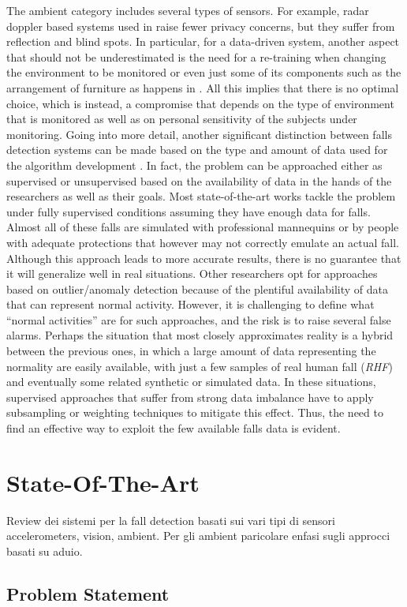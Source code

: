 The ambient category includes several types of sensors. For example, radar doppler based systems used in \cite{wu2015radar} raise fewer privacy concerns, but they suffer from reflection and blind spots. In particular, for a data-driven system, another aspect that should not be underestimated is the need for a re-training when changing the environment to be monitored or even just some of its components such as the arrangement of furniture as happens in \cite{liu2008vision}.
All this implies that there is no optimal choice, which is instead, a compromise that depends on the type of environment that is monitored as well as on personal sensitivity of the subjects under monitoring.
Going into more detail, another significant distinction between falls detection systems can be made based on the type and amount of data used for the algorithm development \cite{khan2017review}. In fact, the problem can be approached either as supervised or unsupervised based on the availability of data in the hands of the researchers as well as their goals. 
Most state-of-the-art works tackle the problem under fully supervised conditions assuming they have enough data for falls. Almost all of these falls are simulated with professional mannequins \cite{werner2011fall, zigel2009method}  or by people with adequate protections \cite{li2012microphone, popescu2008acoustic} that however may not correctly emulate an actual fall. Although this approach leads to more accurate results, there is no guarantee that it will generalize well in real situations. 
Other researchers opt for approaches based on outlier/anomaly detection \cite{khan2015unsupervised, zhang2009detecting, popescu2009acoustic} because of the plentiful availability of data that can represent normal activity. However, it is challenging to define what ``normal activities'' are for such approaches, and the risk is to raise several false alarms. %
Perhaps the situation that most closely approximates reality is a hybrid between the previous ones, in which a large amount of data representing the normality are easily available, with just a few samples of real human fall (\textit{RHF}) and eventually some related synthetic or simulated data. In these situations, supervised approaches that suffer from strong data imbalance have to apply subsampling \cite{stone2015fall} or weighting \cite{khan2017review} techniques to mitigate this effect. Thus, the need to find an effective way to exploit the few available falls data is evident.


\section{State-Of-The-Art} 
Review dei sistemi per la fall detection basati sui vari tipi di sensori
accelerometers, vision, ambient. Per gli ambient paricolare enfasi sugli approcci basati su aduio.
\subsection{Problem Statement}


